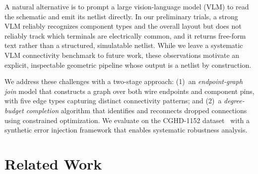 \documentclass[conference]{IEEEtran}
\begin{document}
A natural alternative is to prompt a large vision-language model (VLM) to read the schematic and emit its netlist directly. In our preliminary trials, a strong VLM reliably recognizes component types and the overall layout but does not reliably track which terminals are electrically common, and it returns free-form text rather than a structured, simulatable netlist. While we leave a systematic VLM connectivity benchmark to future work, these observations motivate an explicit, inspectable geometric pipeline whose output is a netlist by construction.

We address these challenges with a two-stage approach: (1)~an \emph{endpoint-graph join} model that constructs a graph over both wire endpoints and component pins, with five edge types capturing distinct connectivity patterns; and (2)~a \emph{degree-budget completion} algorithm that identifies and reconnects dropped connections using constrained optimization. We evaluate on the CGHD-1152 dataset~\cite{bayer2021cghd} with a synthetic error injection framework that enables systematic robustness analysis.

\section{Related Work}
\end{document}
